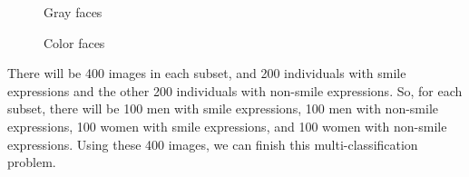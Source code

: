 \documentclass[11pt,letterpaper]{article}
\begin{document}
\begin{figure}[H]
\centering
{}
\caption{Gray faces}
\label{Fig.lable}
\end{figure}

\begin{figure}[H]
\centering
{}
\caption{Color faces}
\label{Fig.lable}
\end{figure}

There will be 400 images in each subset, and 200 individuals with smile expressions and the other 200 individuals with non-smile expressions. So, for each subset, there will be 100 men with smile expressions, 100 men with non-smile expressions, 100 women with smile expressions, and 100 women with non-smile expressions. Using these 400 images, we can finish this multi-classification problem.\\
\end{document}
